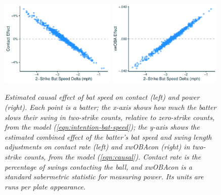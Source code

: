 \documentclass{article}
\begin{document}
      \begin{figure}
        \centering
        \includegraphics[width = 0.49\textwidth]{../../figures/bat_speed_contact.pdf}
        \includegraphics[width = 0.49\textwidth]{../../figures/bat_speed_power.pdf}
        \caption{\it Estimated causal effect of bat speed on contact (left) and power (right). Each point is a batter; the x-axis shows how much the batter slows their swing in two-strike counts, relative to zero-strike counts, from the model (\ref{eqn:intention-bat-speed}); the y-axis shows the estimated combined effect of the batter's bat speed and swing length adjustments on contact rate (left) and xwOBAcon (right) in two-strike counts, from the model (\ref{eqn:causal}). Contact rate is the percentage of swings contacting the ball, and xwOBAcon is a standard sabermetric statistic for measuring power. Its units are runs per plate appearance.}
        \label{fig:results-causal}
      \end{figure}
\end{document}
